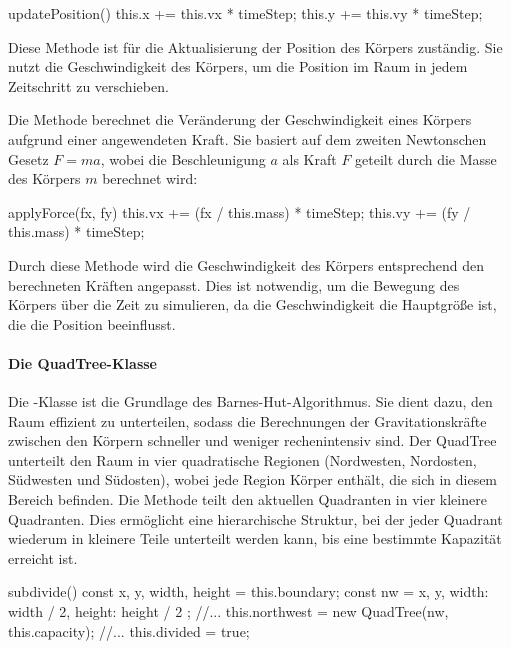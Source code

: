 \documentclass[a4paper,12pt,twoside]{article}
\begin{document}
\begin{javascript}
updatePosition() {
    this.x += this.vx * timeStep;
    this.y += this.vy * timeStep;
}
\end{javascript}

Diese Methode ist für die Aktualisierung der Position des Körpers zuständig. Sie nutzt die Geschwindigkeit des Körpers, um die Position im Raum in jedem Zeitschritt zu verschieben.

Die Methode  berechnet die Veränderung der Geschwindigkeit eines Körpers aufgrund einer angewendeten Kraft. Sie basiert auf dem zweiten Newtonschen Gesetz \(F = ma\), wobei die Beschleunigung \(a\) als Kraft \(F\) geteilt durch die Masse des Körpers \(m\) berechnet wird:

\begin{javascript}
applyForce(fx, fy) {
    this.vx += (fx / this.mass) * timeStep;
    this.vy += (fy / this.mass) * timeStep;
}
\end{javascript}

Durch diese Methode wird die Geschwindigkeit des Körpers entsprechend den berechneten Kräften angepasst. Dies ist notwendig, um die Bewegung des Körpers über die Zeit zu simulieren, da die Geschwindigkeit die Hauptgröße ist, die die Position beeinflusst.

\paragraph{Die QuadTree-Klasse}
Die -Klasse ist die Grundlage des Barnes-Hut-Algorithmus. Sie dient dazu, den Raum effizient zu unterteilen, sodass die Berechnungen der Gravitationskräfte zwischen den Körpern schneller und weniger rechenintensiv sind. Der QuadTree unterteilt den Raum in vier quadratische Regionen (Nordwesten, Nordosten, Südwesten und Südosten), wobei jede Region Körper enthält, die sich in diesem Bereich befinden. Die Methode  teilt den aktuellen Quadranten in vier kleinere Quadranten. Dies ermöglicht eine hierarchische Struktur, bei der jeder Quadrant wiederum in kleinere Teile unterteilt werden kann, bis eine bestimmte Kapazität erreicht ist.

\begin{javascript}
subdivide() {
    const { x, y, width, height } = this.boundary;
    const nw = { x, y, width: width / 2, height: height / 2 };
	//...
    this.northwest = new QuadTree(nw, this.capacity);
	//...
    this.divided = true;
}
\end{javascript}
\end{document}
